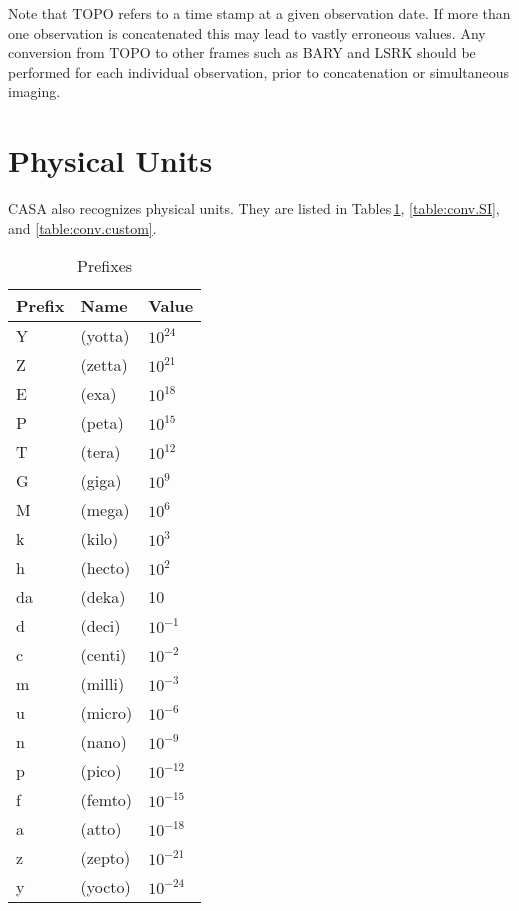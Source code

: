Note that TOPO refers to a time stamp at a given observation date. If
more than one observation is concatenated this may lead to vastly
erroneous values. Any conversion from TOPO to other frames such as
BARY and LSRK should be performed for each individual observation,
prior to concatenation or simultaneous imaging.

\section{Physical Units}

\label{section:conv.units}

CASA also recognizes physical units. They are listed in
Tables\,\ref{table:conv.prefixes}, \ref{table:conv.SI},
and \ref{table:conv.custom}.

\begin{table}[htb]
\caption{Prefixes \label{table:conv.prefixes}}
\begin{center}
\begin{tabular}{lll}
Prefix & Name & Value\\
\hline
    Y  &         (yotta)  &                    $10^{24}$\\
    Z  &         (zetta)  &                    $10^{21}$\\
    E  &         (exa)    &                    $10^{18}$ \\
    P  &         (peta)   &                    $10^{15}$\\
    T  &         (tera)   &                    $10^{12}$\\
    G  &         (giga)   &                    $10^{9}$\\
    M  &         (mega)   &                    $10^{6}$\\
    k  &         (kilo)   &                    $10^{3}$\\
    h  &         (hecto)  &                    $10^{2}$\\
    da &         (deka)   &                    10\\
    d  &         (deci)   &                    $10^{-1}$\\
    c  &         (centi)  &                    $10^{-2}$\\
    m  &         (milli)  &                    $10^{-3}$\\
    u  &         (micro)  &                    $10^{-6}$\\
    n  &         (nano)   &                    $10^{-9}$\\
    p  &         (pico)   &                    $10^{-12}$\\
    f  &         (femto)  &                    $10^{-15}$\\
    a  &         (atto)   &                    $10^{-18}$\\
    z  &         (zepto)  &                    $10^{-21}$\\
    y  &         (yocto)  &                    $10^{-24}$\\

\end{tabular}
\end{center}
\end{table}




